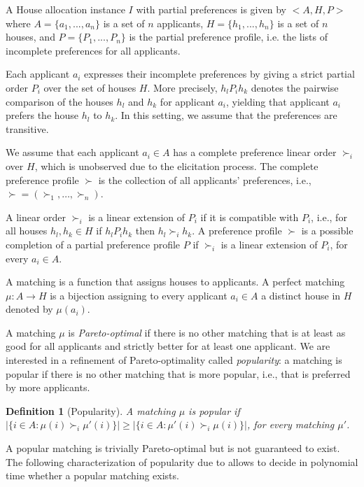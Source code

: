 \documentclass{article}
\newcommand{\agents}{A}
\newcommand{\objects}{H}
\newcommand{\match}{\mu}
\newtheorem{definition}{Definition}
\begin{document}
A House allocation instance $I$ with partial preferences is given by $<\agents, \objects, P>$ where $\agents=\{a_1, ..., a_n\}$ is a set of $n$ applicants, $\objects = \{h_1, ..., h_n\}$ is a set of $n$ houses, and $P=\{P_1, ..., P_n\}$ is the partial preference profile, i.e. the lists of incomplete preferences for all applicants. 

Each applicant $a_i$ expresses their incomplete preferences by giving a strict partial order $P_i$ over the set of houses $\objects$. 
More precisely, $h_l P_i h_k$ denotes the pairwise comparison of the houses $h_l$ and $h_k$ for applicant $a_i$, yielding that applicant $a_i$ prefers the house $h_l$ to $h_k$.
In this setting, we assume that the preferences are transitive.

We assume that each applicant $a_i \in \agents$ has a complete preference linear order $\succ_i$ over $\objects$, which is unobserved due to the elicitation process.
The complete preference profile $\succ$ is the collection of all applicants' preferences, i.e., $\succ=(\succ_1,\dots,\succ_n)$.

A linear order $\succ_i$ is a linear extension of $P_i$ if it is compatible with $P_i$, i.e., for all houses $h_l,h_k\in \objects$ if $h_l P_i h_k$ then $h_l \succ_i h_k$. 
A preference profile $\succ$ is a possible completion of a partial preference profile $P$ if $\succ_i$ is a linear extension of $P_i$, for every $a_i\in \agents$.

A matching is a function that assigns houses to applicants. 
A perfect matching $\match:\agents\to \objects$ is a bijection assigning to every applicant $a_i\in \agents$ a distinct house in $\objects$ denoted by $\match(a_i)$.

A matching $\match$ is \emph{Pareto-optimal} if there is no other matching that is at least as good for all applicants and strictly better for at least one applicant.
We are interested in a refinement of Pareto-optimality called \emph{popularity}: a matching is popular if there is no other matching that is more popular, i.e., that is preferred by more applicants.

\begin{definition}[Popularity]
A matching $\match$ is popular if $|\{i\in \agents: \match(i)\succ_i \match'(i)\}|\geq |\{i\in \agents: \match'(i)\succ_i \match(i)\}|$, for every matching $\match'$.
\end{definition}

A popular matching is trivially Pareto-optimal but is not guaranteed to exist.
The following characterization of popularity due to \citet{abraham2007popular} allows to decide in polynomial time whether a popular matching exists.
\end{document}
